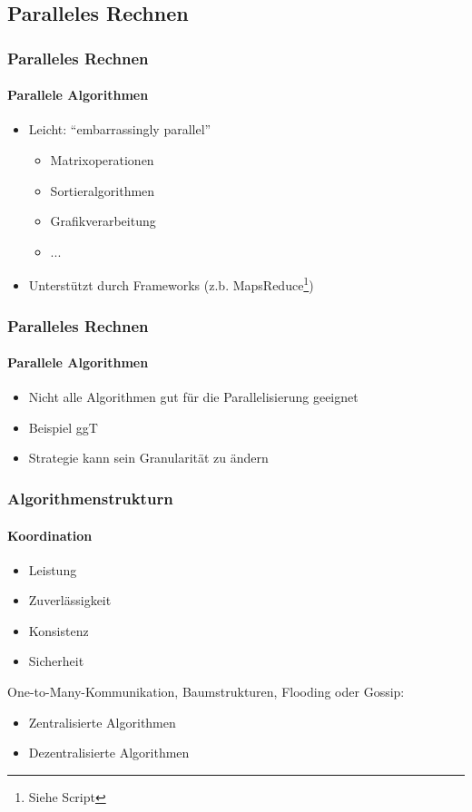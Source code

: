 \subsection{Paralleles Rechnen}
\begin{frame}
  \frametitle{Paralleles Rechnen}
  \framesubtitle{Parallele Algorithmen}
  \begin{itemize}
    \item Leicht: \enquote{embarrassingly parallel} 
    \begin{itemize}
      \item Matrixoperationen
      \item Sortieralgorithmen
      \item Grafikverarbeitung
      \item ...
    \end{itemize}
    \item Unterstützt durch Frameworks (z.b. MapsReduce\footnote{Siehe Script})
  \end{itemize}
\end{frame}


\begin{frame}
  \frametitle{Paralleles Rechnen}
  \framesubtitle{Parallele Algorithmen}
  \begin{itemize}
    \item Nicht alle Algorithmen gut für die Parallelisierung geeignet
    \item Beispiel ggT
    \item Strategie kann sein Granularität zu ändern
  \end{itemize}
\end{frame}

\begin{frame}
  \frametitle{Algorithmenstrukturn}
  \framesubtitle{Koordination}
  \begin{itemize}
      \item Leistung
      \item Zuverlässigkeit
      \item Konsistenz
      \item Sicherheit
  \end{itemize}
  One-to-Many-Kommunikation, Baumstrukturen, Flooding oder Gossip: 
  \begin{itemize}
    \item Zentralisierte Algorithmen 
    \item Dezentralisierte Algorithmen
  \end{itemize}
\end{frame}
